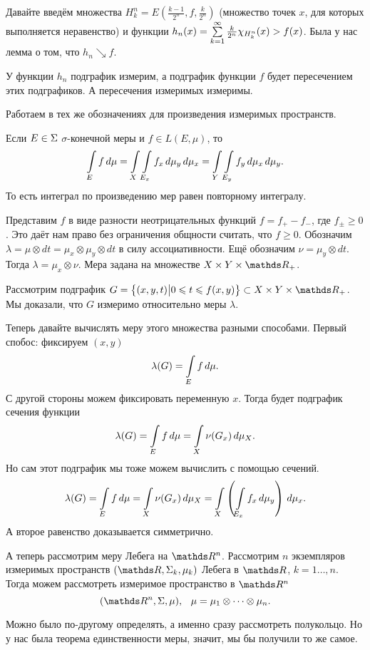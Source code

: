 \begin{Proof}
  Давайте введём множества $H_k^n = E\left(\frac{k-1}{2^{n}},f,\frac k{2^n}\right)$ (множество точек $x$, для которых выполняется неравенство) и функции $h_n(x) = \sum\limits_{k = 1}^{\infty} \frac k{2^n}\chi_{H_k^n}(x)> f(x)$. Была у нас лемма  о том, что $h_n\searrow f$.

У функции $h_n$ подграфик измерим, а подграфик функции $f$ будет пересечением этих подграфиков. А пересечения измеримых измеримы.
\end{Proof}

Работаем в тех же обозначениях для произведения измеримых пространств.
\begin{The}[Фубини]
  Если $E\in\Sigma$ $\sigma$-конечной меры и $f\in L(E,\mu)$, то 
   \[
  \int\limits_{E}f\,d\mu = \int\limits_{X}\int\limits_{E_x}f_x\,d\mu_y\,d\mu_x = \int\limits_{Y}\int\limits_{E_y}f_y\,d\mu_x\,d\mu_y.
\]
То есть интеграл по произведению мер равен повторному интегралу.
\end{The}

\begin{Proof}
  Представим $f$ в виде разности неотрицательных функций $f = f_+-f_-$, где $f_\pm\ge0$. Это даёт нам право без ограничения общности считать, что $f\ge 0$. Обозначим $\lambda = \mu\otimes dt = \mu_x\otimes \mu_y\otimes dt$ в силу ассоциативности. Ещё обозначим $\nu = \mu_y\otimes dt$. Тогда $\lambda = \mu_x\otimes \nu$. Мера задана на множестве $X\times Y\times \R_+$.

Рассмотрим подграфик $G = \big\{(x,y,t)\big|0\le t\le f(x,y)\big\}\subset X\times Y\times \R_+$. Мы доказали, что $G$ измеримо относительно меры $\lambda$.

Теперь давайте вычислять меру этого множества разными способами. Первый спобос: фиксируем $(x,y)$
\[
  \lambda(G) = \int\limits_{E}f\,d\mu.
\]
С другой стороны можем фиксировать переменную $x$. Тогда будет подграфик сечения функции
\[
  \lambda(G) = \int\limits_{E}f\,d\mu = \int\limits_{X}\nu(G_x)\,d\mu_X.
\]
Но сам этот подграфик мы тоже можем вычислить с помощью сечений.
\[
\lambda(G) = \int\limits_{E}f\,d\mu = \int\limits_{X}\nu(G_x)\,d\mu_X = \int\limits_{X}\left(\int\limits_{E_x}f_x\,d\mu_y\right)\,d\mu_x.
\]
А второе равенство доказывается симметрично.
\end{Proof}

А теперь рассмотрим меру Лебега на $\R^n$. Рассмотрим $n$ экземпляров измеримых пространств $(\R,\E_k,\mu_k)$ Лебега в $\R$, $k=1\dots,n$. Тогда можем рассмотреть измеримое пространство в $\R^n$
\[
  (\R^n,\E,\mu),\pau \mu = \mu_1\ods\mu_n.
\]

Можно было по-другому определять, а именно сразу рассмотреть полукольцо. Но у нас была теорема единственности меры, значит, мы бы получили то же самое.

